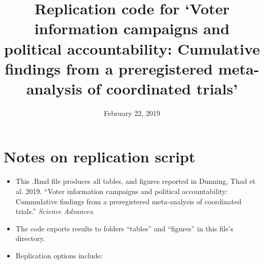 \documentclass[]{article}
\title{Replication code for `Voter information campaigns and political
accountability: Cumulative findings from a preregistered meta-analysis
of coordinated trials'}
\author{}
\date{February 22, 2019}
\begin{document}
\maketitle

{
\setcounter{tocdepth}{3}
\tableofcontents
}
\clearpage

\section{Notes on replication script}\label{notes-on-replication-script}

\begin{itemize}
\item
  This .Rmd file produces all tables, and figures reported in Dunning,
  Thad et al. 2019. ``Voter information campaigns and political
  accountability: Cummulative findings from a preregistered
  meta-analysis of coordinated trials.'' \emph{Science Advances}.
\item
  The code exports results to folders ``tables'' and ``figures'' in this
  file's directory.
\item
  Replication options include:


\end{itemize}
\end{document}
